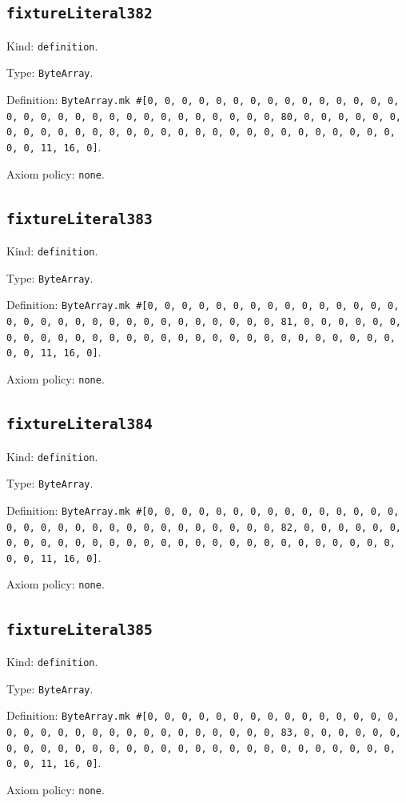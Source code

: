 \documentclass[11pt]{article}
\begin{document}
\subsection*{\texttt{fixtureLiteral382}}
\noindent Kind: \texttt{definition}.\par
\noindent Type: \texttt{ByteArray}.\par
\noindent Definition: \texttt{ByteArray.mk \#[0, 0, 0, 0, 0, 0, 0, 0, 0, 0, 0, 0, 0, 0, 0, 0, 0, 0, 0, 0, 0, 0, 0, 0, 0, 0, 0, 0, 0, 0, 0, 80, 0, 0, 0, 0, 0, 0, 0, 0, 0, 0, 0, 0, 0, 0, 0, 0, 0, 0, 0, 0, 0, 0, 0, 0, 0, 0, 0, 0, 0, 0, 0, 11, 16, 0]}.\par
\noindent Axiom policy: \texttt{none}.\par
\subsection*{\texttt{fixtureLiteral383}}
\noindent Kind: \texttt{definition}.\par
\noindent Type: \texttt{ByteArray}.\par
\noindent Definition: \texttt{ByteArray.mk \#[0, 0, 0, 0, 0, 0, 0, 0, 0, 0, 0, 0, 0, 0, 0, 0, 0, 0, 0, 0, 0, 0, 0, 0, 0, 0, 0, 0, 0, 0, 0, 81, 0, 0, 0, 0, 0, 0, 0, 0, 0, 0, 0, 0, 0, 0, 0, 0, 0, 0, 0, 0, 0, 0, 0, 0, 0, 0, 0, 0, 0, 0, 0, 11, 16, 0]}.\par
\noindent Axiom policy: \texttt{none}.\par
\subsection*{\texttt{fixtureLiteral384}}
\noindent Kind: \texttt{definition}.\par
\noindent Type: \texttt{ByteArray}.\par
\noindent Definition: \texttt{ByteArray.mk \#[0, 0, 0, 0, 0, 0, 0, 0, 0, 0, 0, 0, 0, 0, 0, 0, 0, 0, 0, 0, 0, 0, 0, 0, 0, 0, 0, 0, 0, 0, 0, 82, 0, 0, 0, 0, 0, 0, 0, 0, 0, 0, 0, 0, 0, 0, 0, 0, 0, 0, 0, 0, 0, 0, 0, 0, 0, 0, 0, 0, 0, 0, 0, 11, 16, 0]}.\par
\noindent Axiom policy: \texttt{none}.\par
\subsection*{\texttt{fixtureLiteral385}}
\noindent Kind: \texttt{definition}.\par
\noindent Type: \texttt{ByteArray}.\par
\noindent Definition: \texttt{ByteArray.mk \#[0, 0, 0, 0, 0, 0, 0, 0, 0, 0, 0, 0, 0, 0, 0, 0, 0, 0, 0, 0, 0, 0, 0, 0, 0, 0, 0, 0, 0, 0, 0, 83, 0, 0, 0, 0, 0, 0, 0, 0, 0, 0, 0, 0, 0, 0, 0, 0, 0, 0, 0, 0, 0, 0, 0, 0, 0, 0, 0, 0, 0, 0, 0, 11, 16, 0]}.\par
\noindent Axiom policy: \texttt{none}.\par
\end{document}
